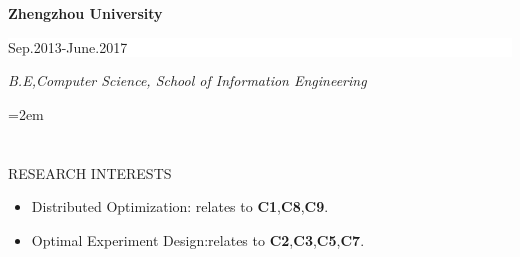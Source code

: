 \documentclass[paper=a4,fontsize=11pt]{scrartcl} %
\newcommand{\sepspace}{\vspace*{1em}}		%
\newcommand{\NewPart}[1]{\section*{\uppercase{#1}}}
\newcommand{\EducationEntry}[4]{
	\noindent \textbf{#1} \hfill      %
	\colorbox{White}{%
		\parbox{5cm}{%
			\hfill\color{Black}#2}} \par  %
	\noindent \textit{#3} \par        %
	\noindent\hangindent=2em\hangafter=0 \small #4 %
	\normalsize \par}
\begin{document}
		\sepspace
		
		\EducationEntry{Zhengzhou  University}{Sep.2013-June.2017}{B.E,Computer Science, School of Information Engineering  }
		
		\NewPart{RESEARCH INTERESTS}{}
		\begin{itemize}
			
			\item{Distributed Optimization}: relates to  \textbf{C1},\textbf{C8},\textbf{C9}. 
			\item{Optimal Experiment Design}:relates to  \textbf{C2},\textbf{C3},\textbf{C5},\textbf{C7}. 
			
			
	
			
		\end{itemize}
		
\end{document}
